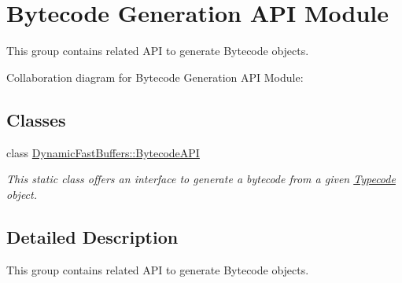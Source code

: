 \hypertarget{group___b_y_t_e_c_o_d_e_a_p_i_m_o_d_u_l_e}{\section{Bytecode Generation A\-P\-I Module}
\label{group___b_y_t_e_c_o_d_e_a_p_i_m_o_d_u_l_e}
}


This group contains related A\-P\-I to generate Bytecode objects.  


Collaboration diagram for Bytecode Generation A\-P\-I Module\-:
\subsection*{Classes}
\begin{DoxyCompactItemize}
\item 
class \hyperlink{class_dynamic_fast_buffers_1_1_bytecode_a_p_i}{Dynamic\-Fast\-Buffers\-::\-Bytecode\-A\-P\-I}
\begin{DoxyCompactList}\small\item\em This static class offers an interface to generate a bytecode from a given \hyperlink{class_dynamic_fast_buffers_1_1_typecode}{Typecode} object. \end{DoxyCompactList}\end{DoxyCompactItemize}


\subsection{Detailed Description}
This group contains related A\-P\-I to generate Bytecode objects. 